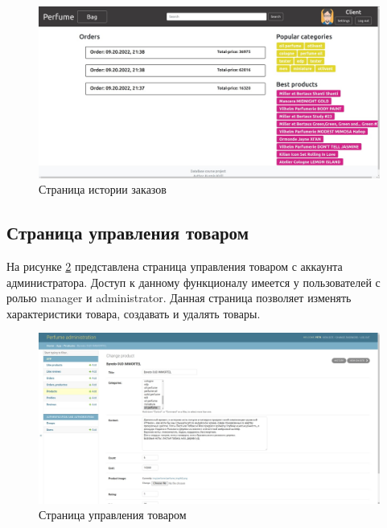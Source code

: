 \captionsetup{singlelinecheck = false, justification=centering}
\begin{figure}[h!]
	\begin{center}
		\includegraphics[scale=0.45]{assets/site_orders.jpg}
	\end{center}
	\caption{Страница истории заказов}
	\label{site_orders}
\end{figure}

\subsection{Страница управления товаром}

На рисунке \ref{site_admin_product} представлена страница управления товаром с аккаунта администратора. Доступ к данному функционалу имеется у пользователей с ролью manager и administrator. Данная страница позволяет изменять характеристики товара, создавать и удалять товары.

\captionsetup{singlelinecheck = false, justification=centering}
\begin{figure}[h!]
	\begin{center}
		\includegraphics[scale=0.45]{assets/site_admin_product.jpg}
	\end{center}
	\caption{Страница управления товаром}
	\label{site_admin_product}
\end{figure}

